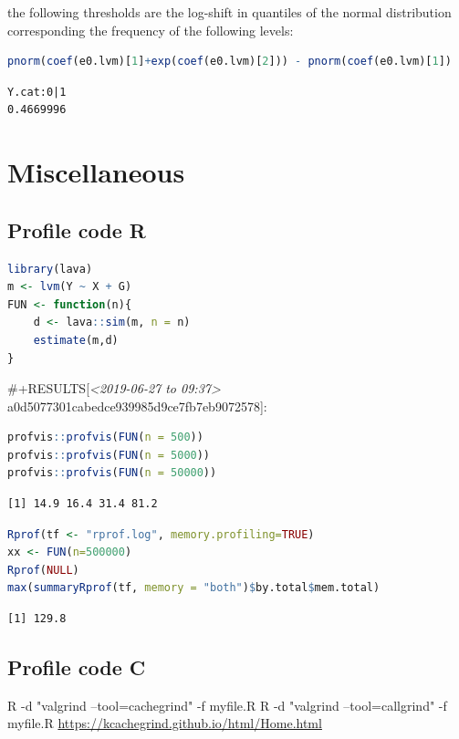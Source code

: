 \documentclass{article}
\begin{document}
the following thresholds are the log-shift in quantiles of the normal
distribution corresponding the frequency of the following levels:
\begin{lstlisting}[language=r,numbers=none]
pnorm(coef(e0.lvm)[1]+exp(coef(e0.lvm)[2])) - pnorm(coef(e0.lvm)[1])
\end{lstlisting}

\label{}
\begin{verbatim}
Y.cat:0|1 
0.4669996
\end{verbatim}
\section{Miscellaneous}
\label{sec:org6e2d643}
\subsection{Profile code R}
\label{sec:orge1059bb}

\begin{lstlisting}[language=r,numbers=none]
library(lava)
m <- lvm(Y ~ X + G)
FUN <- function(n){
    d <- lava::sim(m, n = n)
    estimate(m,d)
}
\end{lstlisting}

\#+RESULTS[\textit{<2019-06-27 to 09:37> } a0d5077301cabedce939985d9ce7fb7eb9072578]:

\begin{lstlisting}[language=r,numbers=none]
profvis::profvis(FUN(n = 500))
profvis::profvis(FUN(n = 5000))
profvis::profvis(FUN(n = 50000))
\end{lstlisting}

\label{}
\begin{verbatim}
[1] 14.9 16.4 31.4 81.2
\end{verbatim}


\begin{lstlisting}[language=r,numbers=none]
Rprof(tf <- "rprof.log", memory.profiling=TRUE)
xx <- FUN(n=500000)
Rprof(NULL)
max(summaryRprof(tf, memory = "both")$by.total$mem.total)

\end{lstlisting}

\label{}
\begin{verbatim}
[1] 129.8
\end{verbatim}
\subsection{Profile code C}
\label{sec:orgfc1bd94}
R -d "valgrind --tool=cachegrind" -f myfile.R
R -d "valgrind --tool=callgrind" -f myfile.R
\url{https://kcachegrind.github.io/html/Home.html}
\end{document}
